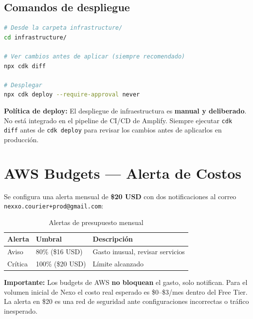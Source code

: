 \documentclass[12pt,a4paper]{article}
\begin{document}
\subsection{Comandos de despliegue}

\begin{lstlisting}[language=bash, caption={Despliegue manual de infraestructura}]
# Desde la carpeta infrastructure/
cd infrastructure/

# Ver cambios antes de aplicar (siempre recomendado)
npx cdk diff

# Desplegar
npx cdk deploy --require-approval never
\end{lstlisting}

\begin{nexobox}
\textbf{Política de deploy:} El despliegue de infraestructura es \textbf{manual y
deliberado}. No está integrado en el pipeline de CI/CD de Amplify. Siempre ejecutar
\texttt{cdk diff} antes de \texttt{cdk deploy} para revisar los cambios antes
de aplicarlos en producción.
\end{nexobox}

\section{AWS Budgets --- Alerta de Costos}

Se configura una alerta mensual de \textbf{\$20 USD} con dos notificaciones
al correo \texttt{nexxo.courier+prod@gmail.com}:

\begin{table}[H]
\centering
\begin{tabular}{@{}lll@{}}
\toprule
\textbf{Alerta} & \textbf{Umbral} & \textbf{Descripción} \\
\midrule
Aviso & 80\% (\$16 USD) & Gasto inusual, revisar servicios \\
Crítica & 100\% (\$20 USD) & Límite alcanzado \\
\bottomrule
\end{tabular}
\caption{Alertas de presupuesto mensual}
\end{table}

\begin{nexobox}
\textbf{Importante:} Los budgets de AWS \textbf{no bloquean} el gasto, solo notifican.
Para el volumen inicial de Nexo el costo real esperado es \$0--\$3/mes dentro del
Free Tier. La alerta en \$20 es una red de seguridad ante configuraciones incorrectas
o tráfico inesperado.
\end{nexobox}
\end{document}
